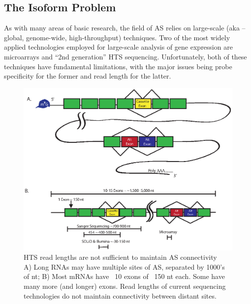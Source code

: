 \subsection{The Isoform Problem}

As with many areas of basic research, the field of AS relies on large-scale (aka – global, genome-wide, high-throughput) techniques. Two of the most widely applied technologies employed for large-scale analysis of gene expression are microarrays and ``2nd generation'' HTS sequencing. Unfortunately, both of these techniques have fundamental limitations, with the major issues being probe specificity for the former and read length for the latter.

\begin{figure}[htbp]
	\centering 
	\includegraphics{Figures/Chapter1/SeqLengths_and_Connectivity.eps}
	\caption[HTS read lengths are not sufficient to maintain AS connectivity]
	{
		HTS read lengths are not sufficient to maintain AS connectivity\\[0.25cm]
		A) Long RNAs may have multiple sites of AS, separated by 1000's of nt; B) Most mRNAs have ~10 exons of ~150 nt each. Some have many more (and longer) exons. Read lengths of current sequencing technologies do not maintain connectivity between distant sites.
	}
	\label{fig:NoConnectivityInHTSMethods}
\end{figure}

